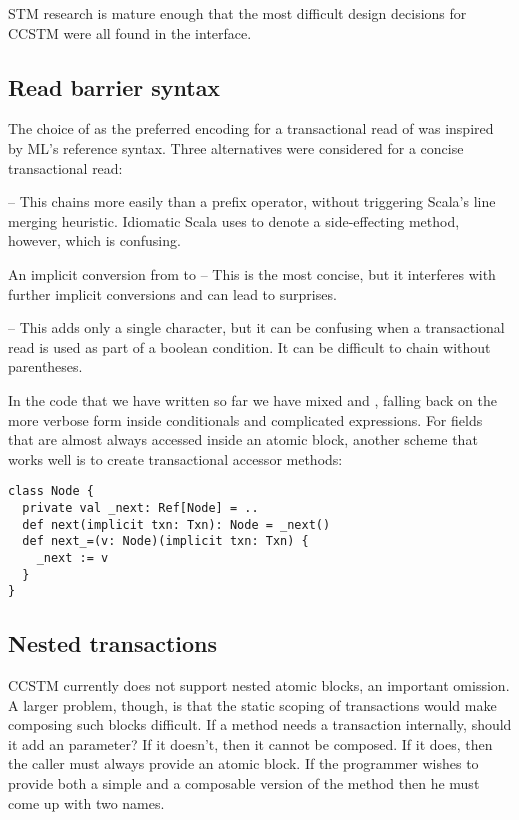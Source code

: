 \color{green}
STM research is mature enough that the most difficult design decisions
for CCSTM were all found in the interface.

\subsection{Read barrier syntax}
\label{sec:syntax}

The choice of  as the preferred encoding for a transactional
read of  was inspired by ML's reference syntax.  Three alternatives
were considered for a concise transactional read:
\begin{packed_enum}
\item {} -- This chains more easily than a prefix operator, without
triggering Scala's line merging heuristic.  Idiomatic Scala uses \code{()} to
denote a side-effecting method, however, which is confusing.
\item An implicit conversion from  to  -- This is
the most concise, but it interferes with further implicit conversions and
can lead to surprises.
\item {} -- This adds only a single character, but it can be
confusing when a transactional read is used as part of a boolean condition.
It can be difficult to chain without parentheses.
\end{packed_enum}

In the code that we have written so far we have mixed  and
, falling back on the more verbose form inside conditionals and
complicated expressions.  For fields that are almost always accessed inside
an atomic block, another scheme that works well is to create transactional
accessor methods:
\lstset{numbers=none}
\begin{lstlisting}
class Node {
  private val _next: Ref[Node] = ..
  def next(implicit txn: Txn): Node = _next()
  def next_=(v: Node)(implicit txn: Txn) {
    _next := v
  }
}
\end{lstlisting}
\lstset{numbers=left}

\subsection{Nested transactions}

CCSTM currently does not support nested atomic blocks, an important
omission.  A larger problem, though, is that the static scoping
of transactions would make composing such blocks difficult.  If a
method  needs a transaction internally, should it add an
  parameter?  If it doesn't, then it
cannot be composed.  If it does, then the caller must always provide
an atomic block.  If the programmer wishes to provide both a simple
and a composable version of the method then he must come up with
two names.

